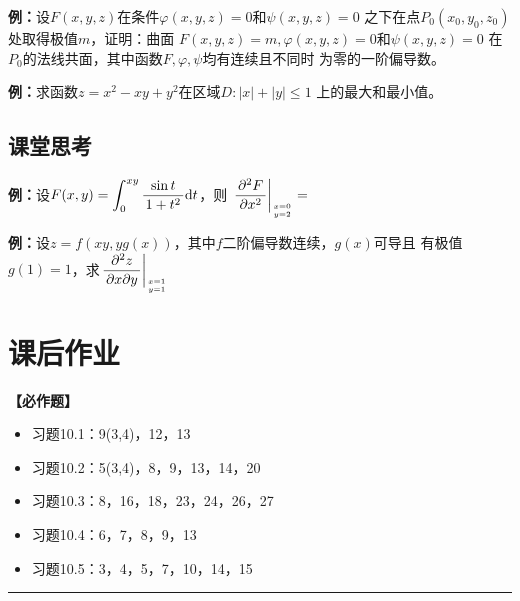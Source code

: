 {\bf 例：}设$F(x,y,z)$在条件$\varphi(x,y,z)=0$和$\psi(x,y,z)=0$
之下在点$P_0(x_0,y_0,z_0)$处取得极值$m$，证明：曲面
$F(x,y,z)=m,\varphi(x,y,z)=0$和$\psi(x,y,z)=0$
在$P_0$的法线共面，其中函数$F,\varphi,\psi$均有连续且不同时
为零的一阶偏导数。

{\bf 例：}求函数$z=x^2-xy+y^2$在区域$D:|x|+|y|\leq 1$
上的最大和最小值。

\subsection*{课堂思考}

{\bf 例：}设$F(x,y)=\displaystyle\int_0^{xy}\displaystyle\frac{\,{\sin t}\,}{\,{1+t^2}\,}\mathrm{d} t$，则
$\left.\displaystyle\frac{\,{\partial^2F}\,}{\,{\partial x^2}\,}\right|_{x=0 \atop y=2}=$
\underline{\quad\quad\quad}

{\bf 例：}设$z=f(xy,yg(x))$，其中$f$二阶偏导数连续，$g(x)$可导且
有极值$g(1)=1$，求$\left.\displaystyle\frac{\,{\partial^2z}\,}{\,{\partial x\partial y}\,}\right|_{x=1\atop y=1}$

\newpage

\section*{课后作业}

{\bf 【必作题】}

\begin{itemize}
  \setlength{\itemindent}{1cm}
  \item 习题10.1：9(3,4)，12，13
  \item 习题10.2：5(3,4)，8，9，13，14，20
  \item 习题10.3：8，16，18，23，24，26，27
  \item 习题10.4：6，7，8，9，13
  \item 习题10.5：3，4，5，7，10，14，15
\end{itemize}

\bigskip

\hrule

\bigskip




